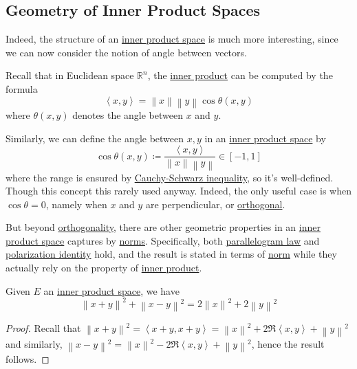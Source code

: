 \subsection{Geometry of Inner Product Spaces}
Indeed, the structure of an \hyperref[def:inner-product-space]{inner product space} is much more interesting, since we can now consider the notion of angle between vectors.
\begin{prev}
	Recall that in Euclidean space \(\mathbb{R} ^n\), the \hyperref[def:inner-product]{inner product} can be computed by the formula
	\[
		\left\langle x, y \right\rangle = \left\lVert x\right\rVert \left\lVert y\right\rVert \cos \theta (x, y)
	\]
	where \(\theta (x, y)\) denotes the angle between \(x\) and \(y\).
\end{prev}

Similarly, we can define the angle between \(x, y\) in an \hyperref[def:inner-product-space]{inner product space} by
\[
	\cos \theta (x, y) \coloneqq \frac{\left\langle x, y \right\rangle }{\left\lVert x\right\rVert \left\lVert y\right\rVert } \in [-1, 1]
\]
where the range is ensured by \hyperref[thm:Cauchy-Schwarz-ineq]{Cauchy-Schwarz inequality}, so it's well-defined. Though this concept this rarely used anyway. Indeed, the only useful case is when \(\cos \theta = 0\), namely when \(x\) and \(y\) are perpendicular, or \hyperref[def:orthogonal]{orthogonal}.

But beyond \hyperref[def:orthogonal]{orthogonality}, there are other geometric properties in an \hyperref[def:inner-product-space]{inner product space} captures by \hyperref[def:norm]{norms}. Specifically, both \hyperref[lma:parallelogram-law]{parallelogram law} and \hyperref[lma:polarization-identity]{polarization identity} hold, and the result is stated in terms of \hyperref[def:norm]{norm} while they actually rely on the property of \hyperref[def:inner-product]{inner product}.

\begin{lemma}\label{lma:parallelogram-law}
	Given \(E\) an \hyperref[def:inner-product-space]{inner product space}, we have
	\[
		\left\lVert x+y\right\rVert ^{2} + \left\lVert x-y\right\rVert ^{2} = 2\left\lVert x\right\rVert ^{2} + 2\left\lVert y\right\rVert ^{2}
	\]
\end{lemma}
\begin{proof}
	Recall that \(\left\lVert x + y\right\rVert ^{2} = \left\langle x + y, x + y \right\rangle = \left\lVert x\right\rVert ^{2} + 2 \Re \left\langle x, y \right\rangle + \left\lVert y\right\rVert ^{2} \) and similarly, \(\left\lVert x - y\right\rVert ^{2} = \left\lVert x\right\rVert ^{2} - 2\Re \left\langle x, y \right\rangle + \left\lVert y\right\rVert ^{2}\), hence the result follows.
\end{proof}

